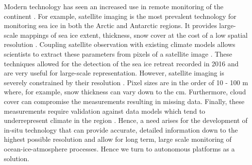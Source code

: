 
Modern technology has seen an increased use in remote monitoring of the continent \cite{kennicutt2016delivering}. For example, satellite imaging is the most prevalent technology for monitoring sea ice in both the Arctic and Antarctic regions. It provides large-scale mappings of sea ice extent, thickness, snow cover at  the cost of a low spatial resolution \cite{turner2017unprecedented}   \cite{galin2011validation} \cite{alberello2019drift}. Coupling satellite observation with existing climate models allows scientists to extract these parameters from pixels of a satellite image \cite{galin2011validation}. These techniques allowed for the detection of the sea ice retreat recorded in 2016 \cite{turner2017unprecedented} and are very useful for large-scale representation. However, satellite imaging is severely constrained by their resolution \cite{emery1997satellite}. Pixel sizes are in the order of 10 - 100 m \cite{galin2011validation} where, for example, snow thickness can vary down to the cm. Furthermore, cloud cover can compromise the measurements resulting in missing data. Finally, these measurements require validation against data models which tend to underrepresent climate in the region \cite{galin2011validation} \cite{emery1997satellite}. Hence, a need arises for the development of in-situ technology that can provide accurate, detailed information down to the highest possible resolution and allow for long term, large scale monitoring of ocean-ice-atmosphere processes. Hence we turn to autonomous platforms as a solution.\par 

